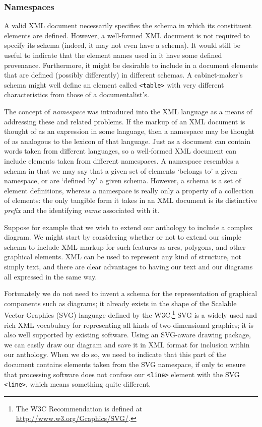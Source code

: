 \subsubsection[{Namespaces}]{Namespaces}\label{SGname}\par
A valid XML document necessarily specifies the schema in which its constituent elements are defined. However, a well-formed XML document is not required to specify its schema (indeed, it may not even have a schema). It would still be useful to indicate that the element names used in it have some defined provenance. Furthermore, it might be desirable to include in a document elements that are defined (possibly differently) in different schemas. A cabinet-maker's schema might well define an element called \texttt{<table>} with very different characteristics from those of a documentalist's.\par
The concept of \textit{namespace} was introduced into the XML language as a means of addressing these and related problems. If the markup of an XML document is thought of as an expression in some language, then a namespace may be thought of as analogous to the lexicon of that language. Just as a document can contain words taken from different languages, so a well-formed XML document can include elements taken from different namespaces. A namespace resembles a schema in that we may say that a given set of elements ‘belongs to’ a given namespace, or are ‘defined by’ a given schema. However, a schema is a set of element definitions, whereas a namespace is really only a property of a collection of elements: the only tangible form it takes in an XML document is its distinctive \textit{prefix} and the identifying \textit{name} associated with it.\par
Suppose for example that we wish to extend our anthology to include a complex diagram. We might start by considering whether or not to extend our simple schema to include XML markup for such features as arcs, polygons, and other graphical elements. XML can be used to represent any kind of structure, not simply text, and there are clear advantages to having our text and our diagrams all expressed in the same way.\par
Fortunately we do not need to invent a schema for the representation of graphical components such as diagrams; it already exists in the shape of the Scalable Vector Graphics (SVG) language defined by the W3C.\footnote{The W3C Recommendation is defined at \url{http://www.w3.org/Graphics/SVG/}.} SVG is a widely used and rich XML vocabulary for representing all kinds of two-dimensional graphics; it is also well supported by existing software. Using an SVG-aware drawing package, we can easily draw our diagram and save it in XML format for inclusion within our anthology. When we do so, we need to indicate that this part of the document contains elements taken from the SVG namespace, if only to ensure that processing software does not confuse our \texttt{<line>} element with the SVG \texttt{<line>}, which means something quite different.\par
